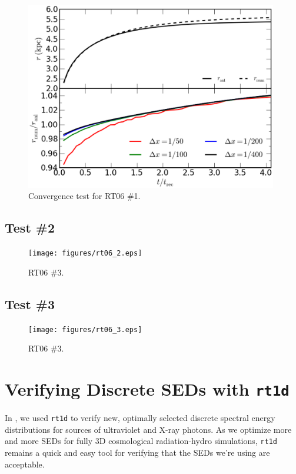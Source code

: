 \documentclass[letterpaper,titlepage,12pt]{article}
\numberwithin{equation}{section}
\begin{document}
\begin{figure}[htbp!]
\begin{center}
\includegraphics[width=0.98\textwidth]{figures/rt06_1_convergence.eps}
\caption{Convergence test for RT06 \#1.}
\label{fig:RT06_1}
\end{center}
\end{figure}

\subsection{Test \#2}

\begin{figure}[htbp!]
\begin{center}
\texttt{[image: figures/rt06\_2.eps]}
\caption{RT06 \#3.}
\label{fig:RT06_2}
\end{center}
\end{figure}
            
\subsection{Test \#3}

\begin{figure}[htbp!]
\begin{center}
\texttt{[image: figures/rt06\_3.eps]}
\caption{RT06 \#3.}
\label{fig:RT06_3}
\end{center}
\end{figure}

\section{Verifying Discrete SEDs with \texttt{rt1d}} \label{sec:Discretization}
In \citet{Mirocha2012}, we used \texttt{rt1d} to verify new, optimally
selected discrete spectral energy distributions for sources of ultraviolet and
X-ray photons. As we optimize more and more SEDs for fully 3D cosmological
radiation-hydro simulations, \texttt{rt1d} remains a quick and easy tool for
verifying that the SEDs we're using are acceptable.
\end{document}
